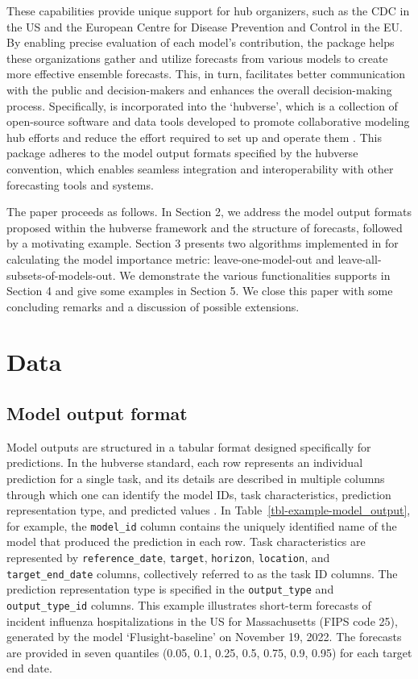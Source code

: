\documentclass[
  article,
  shortnames,
  notitle]{jss}
\begin{document}
These capabilities provide unique support for hub organizers, such as
the CDC in the US and the European Centre for Disease Prevention and
Control in the EU. By enabling precise evaluation of each model's
contribution, the  package helps these
organizations gather and utilize forecasts from various models to create
more effective ensemble forecasts. This, in turn, facilitates better
communication with the public and decision-makers and enhances the
overall decision-making process. Specifically,  is
incorporated into the `hubverse', which is a collection of open-source
software and data tools developed to promote collaborative modeling hub
efforts and reduce the effort required to set up and operate them
\citep{hubverse_docs}. This package adheres to the model output formats
specified by the hubverse convention, which enables seamless integration
and interoperability with other forecasting tools and systems.

The paper proceeds as follows. In Section 2, we address the model output
formats proposed within the hubverse framework and the structure of
forecasts, followed by a motivating example. Section 3 presents two
algorithms implemented in  for calculating the
model importance metric: leave-one-model-out and
leave-all-subsets-of-models-out. We demonstrate the various
functionalities  supports in Section 4 and give
some examples in Section 5. We close this paper with some concluding
remarks and a discussion of possible extensions.

\section{Data}\label{sec:data}

\subsection{Model output format}\label{subsec:model_output_format}

Model outputs are structured in a tabular format designed specifically
for predictions. In the hubverse standard, each row represents an
individual prediction for a single task, and its details are described
in multiple columns through which one can identify the model IDs, task
characteristics, prediction representation type, and predicted values
\citep{Shandross2024}. In Table~\ref{tbl-example-model_output}, for
example, the \texttt{model\_id} column contains the uniquely identified
name of the model that produced the prediction in each row. Task
characteristics are represented by \texttt{reference\_date},
\texttt{target}, \texttt{horizon}, \texttt{location}, and
\texttt{target\_end\_date} columns, collectively referred to as the task
ID columns. The prediction representation type is specified in the
\texttt{output\_type} and \texttt{output\_type\_id} columns. This
example illustrates short-term forecasts of incident influenza
hospitalizations in the US for Massachusetts (FIPS code 25), generated
by the model `Flusight-baseline' on November 19, 2022. The forecasts are
provided in seven quantiles (0.05, 0.1, 0.25, 0.5, 0.75, 0.9, 0.95) for
each target end date.
\end{document}
